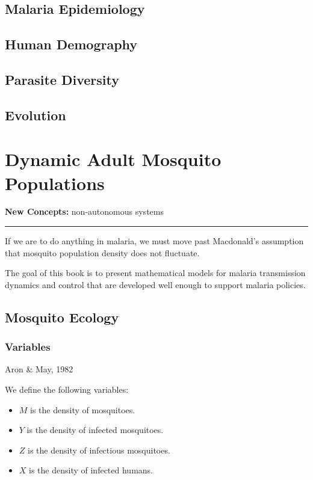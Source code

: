 \documentclass[
]{book}
\begin{document}
\section{Malaria Epidemiology}\label{malaria-epidemiology}

\section{Human Demography}\label{human-demography}

\section{Parasite Diversity}\label{parasite-diversity}

\section{Evolution}\label{evolution}

\chapter{Dynamic Adult Mosquito Populations}\label{aron-may}

\textbf{New Concepts:} non-autonomous systems

\begin{center}\rule{0.5\linewidth}{0.5pt}\end{center}

If we are to do anything in malaria, we must move past Macdonald's assumption that mosquito population density does not fluctuate.

The goal of this book is to present mathematical models for malaria transmission dynamics and control that are developed well enough to support malaria policies.

\section{Mosquito Ecology}\label{mosquito-ecology-1}

\subsection{Variables}\label{variables}

Aron \& May, 1982

We define the following variables:

\begin{itemize}
\item
  \(M\) is the density of mosquitoes.
\item
  \(Y\) is the density of infected mosquitoes.
\item
  \(Z\) is the density of infectious mosquitoes.
\item
  \(X\) is the density of infected humans.
\end{itemize}
\end{document}
